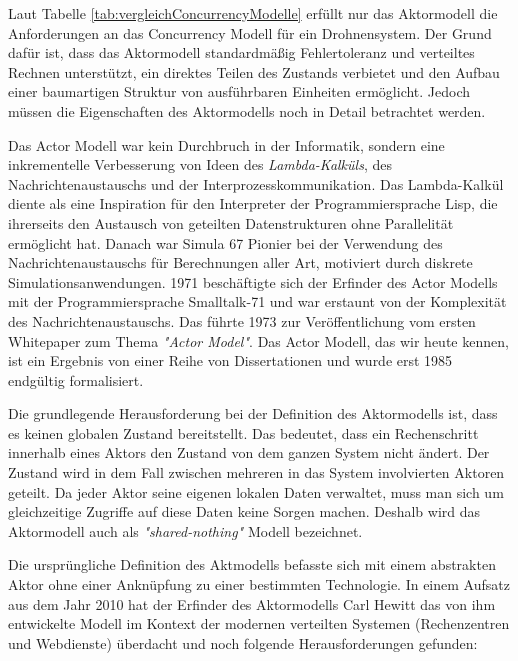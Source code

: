 Laut Tabelle \ref{tab:vergleichConcurrencyModelle} erfüllt nur das Aktormodell die Anforderungen an das Concurrency Modell für ein Drohnensystem. Der Grund dafür ist, dass das Aktormodell standardmäßig Fehlertoleranz und verteiltes Rechnen unterstützt, ein direktes Teilen des Zustands verbietet und den Aufbau einer baumartigen Struktur von ausführbaren Einheiten ermöglicht. Jedoch müssen die Eigenschaften des Aktormodells noch in Detail betrachtet werden.

Das Actor Modell war kein Durchbruch in der Informatik, sondern eine inkrementelle Verbesserung von Ideen des \textit{Lambda-Kalküls}, des Nachrichtenaustauschs und der Interprozesskommunikation. Das Lambda-Kalkül diente als eine Inspiration für den Interpreter der Programmiersprache Lisp, die ihrerseits den Austausch von geteilten Datenstrukturen ohne Parallelität ermöglicht hat. Danach war Simula 67 Pionier bei der Verwendung des Nachrichtenaustauschs für Berechnungen aller Art, motiviert durch diskrete Simulationsanwendungen. 1971 beschäftigte sich der Erfinder des Actor Modells mit der Programmiersprache Smalltalk-71 und war erstaunt von der Komplexität des Nachrichtenaustauschs. Das führte 1973 zur Veröffentlichung vom ersten Whitepaper zum Thema \textit{"Actor Model"}. Das Actor Modell, das wir heute kennen, ist ein Ergebnis von einer Reihe von Dissertationen und wurde erst 1985 endgültig formalisiert.

Die grundlegende Herausforderung bei der Definition des Aktormodells ist, dass es keinen globalen Zustand bereitstellt. Das bedeutet, dass ein Rechenschritt innerhalb eines Aktors den Zustand von dem ganzen System  nicht ändert. Der Zustand wird in dem Fall zwischen mehreren in das System involvierten Aktoren geteilt. Da jeder Aktor seine eigenen lokalen Daten verwaltet, muss man sich um gleichzeitige Zugriffe auf diese Daten keine Sorgen machen. Deshalb wird das Aktormodell auch als \textit{"shared-nothing"} Modell bezeichnet.

Die ursprüngliche Definition des Aktmodells befasste sich mit einem abstrakten Aktor ohne einer Anknüpfung zu einer bestimmten Technologie. In einem Aufsatz aus dem Jahr 2010 hat der Erfinder des Aktormodells Carl Hewitt das von ihm entwickelte Modell im Kontext der modernen verteilten Systemen (Rechenzentren und Webdienste) überdacht und noch folgende Herausforderungen gefunden:

